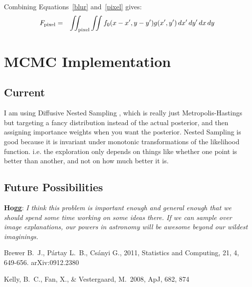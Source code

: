 \documentclass[letterpaper, 11pt]{article}
\begin{document}
Combining Equations~\ref{blur} and~\ref{pixel} gives:
\begin{eqnarray}
F_{\rm{pixel}} &=& \iint_{\rm{pixel}} \iint f_0(x-x', y-y')
g(x', y') \, dx' \, dy' \,dx\,dy
\end{eqnarray}

\section{MCMC Implementation}
\subsection{Current}
I am using Diffusive Nested Sampling \citep{dnest}, which is really just
Metropolis-Hastings but targeting a fancy distribution instead of the actual
posterior, and then assigning importance weights when you want the posterior.
Nested Sampling is good because it is invariant under monotonic transformations
of the likelihood function. i.e. the exploration only depends on things like
whether one point is better than another, and not on how much better it is.



\subsection{Future Possibilities}
{\bf Hogg}: {\it I think this problem is important enough and general enough
that we should spend some time working on some ideas there.  If we can sample
over image explanations, our powers in astronomy will be awesome
beyond our wildest imaginings.}


\begin{thebibliography}{99}
 Brewer B.~J., P{\'a}rtay L.~B.,
Cs{\'a}nyi G., 2011, Statistics and Computing, 21, 4, 649-656. arXiv:0912.2380

 Kelly, B.~C., Fan, X., 
\& Vestergaard, M.\ 2008, ApJ, 682, 874 
\end{thebibliography}
\end{document}
